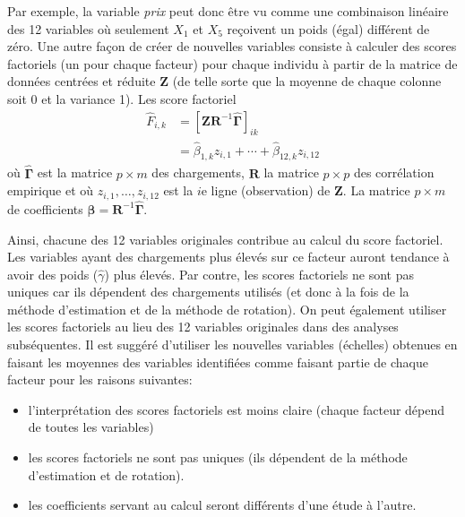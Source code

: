 \documentclass[
  11pt,
  letterpaper,
]{scrbook}
\providecommand{\tightlist}{%
  \setlength{\itemsep}{0pt}\setlength{\parskip}{0pt}}\usepackage{longtable,booktabs,array}
\theoremstyle{definition}
\theoremstyle{remark}
\begin{document}
Par exemple, la variable \emph{prix} peut donc être vu comme une
combinaison linéaire des 12 variables où seulement \(X_1\) et \(X_5\)
reçoivent un poids (égal) différent de zéro. Une autre façon de créer de
nouvelles variables consiste à calculer des scores factoriels (un pour
chaque facteur) pour chaque individu à partir de la matrice de données
centrées et réduite \(\mathbf{Z}\) (de telle sorte que la moyenne de
chaque colonne soit 0 et la variance 1). Les score factoriel
\begin{align*}
\widehat{F}_{i, k} &= \left[\mathbf{Z}\mathbf{R}^{-1}\widehat{\boldsymbol{\Gamma}}\right]_{ik}\\&=
\widehat{\beta}_{1, k} z_{i, 1} + \cdots + \widehat{\beta}_{12, k}z_{i, 12}
\end{align*} où \(\widehat{\boldsymbol{\Gamma}}\) est la matrice
\(p \times m\) des chargements, \(\mathbf{R}\) la matrice \(p \times p\)
des corrélation empirique et où \(z_{i, 1}, \ldots, z_{i, 12}\) est la
\(i\)e ligne (observation) de \(\mathbf{Z}\). La matrice \(p \times m\)
de coefficients
\(\boldsymbol{\beta} = \mathbf{R}^{-1}\widehat{\boldsymbol{\Gamma}}\).

Ainsi, chacune des 12 variables originales contribue au calcul du score
factoriel. Les variables ayant des chargements plus élevés sur ce
facteur auront tendance à avoir des poids (\(\widehat{\gamma}\)) plus
élevés. Par contre, les scores factoriels ne sont pas uniques car ils
dépendent des chargements utilisés (et donc à la fois de la méthode
d'estimation et de la méthode de rotation). On peut également utiliser
les scores factoriels au lieu des 12 variables originales dans des
analyses subséquentes. Il est suggéré d'utiliser les nouvelles variables
(échelles) obtenues en faisant les moyennes des variables identifiées
comme faisant partie de chaque facteur pour les raisons suivantes:

\begin{itemize}
\tightlist
\item
  l'interprétation des scores factoriels est moins claire (chaque
  facteur dépend de toutes les variables)
\item
  les scores factoriels ne sont pas uniques (ils dépendent de la méthode
  d'estimation et de rotation).
\item
  les coefficients servant au calcul seront différents d'une étude à
  l'autre.
\end{itemize}
\end{document}

